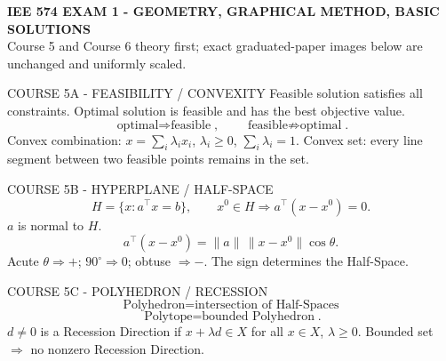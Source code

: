 \documentclass[10pt,landscape]{article}
\begin{document}
\fontsize{5.55}{5.85}\selectfont
\begin{center}
{\fontsize{10.2}{10.5}\selectfont\bfseries IEE 574 EXAM 1 - GEOMETRY, GRAPHICAL METHOD, BASIC SOLUTIONS}\\[-1pt]
{\fontsize{5.85}{6.05}\selectfont Course 5 and Course 6 theory first; exact graduated-paper images below are unchanged and uniformly scaled.}
\end{center}\vspace{-1.5pt}

{\fontsize{5.05}{5.28}\selectfont
\noindent
\begin{minipage}[t]{0.245\textwidth}\vspace{0pt}
\begin{theorybox}{COURSE 5A - FEASIBILITY / CONVEXITY}
Feasible solution satisfies all constraints. Optimal solution is feasible and has the best objective value.
\[
\boxed{\text{optimal}\Rightarrow\text{feasible}},\qquad\boxed{\text{feasible}\not\Rightarrow\text{optimal}}.
\]
Convex combination: $x=\sum_i\lambda_i x_i$, $\lambda_i\ge0$, $\sum_i\lambda_i=1$. Convex set: every line segment between two feasible points remains in the set.
\end{theorybox}
\end{minipage}\hfill
\begin{minipage}[t]{0.245\textwidth}\vspace{0pt}
\begin{theorybox}{COURSE 5B - HYPERPLANE / HALF-SPACE}
\[
\boxed{H=\{x:a^\top x=b\}},\qquad x^0\in H\Rightarrow\boxed{a^\top(x-x^0)=0}.
\]
$a$ is normal to $H$.
\[
\boxed{a^\top(x-x^0)=\|a\|\,\|x-x^0\|\cos\theta}.
\]
Acute $\theta\Rightarrow+$; $90^\circ\Rightarrow0$; obtuse $\Rightarrow-$. The sign determines the Half-Space.
\end{theorybox}
\end{minipage}\hfill
\begin{minipage}[t]{0.245\textwidth}\vspace{0pt}
\begin{theorybox}{COURSE 5C - POLYHEDRON / RECESSION}
\[
\boxed{\text{Polyhedron}=\text{intersection of Half-Spaces}}
\]
\[
\boxed{\text{Polytope}=\text{bounded Polyhedron}}.
\]
$d\ne0$ is a Recession Direction if $x+\lambda d\in X$ for all $x\in X$, $\lambda\ge0$. Bounded set $\Rightarrow$ no nonzero Recession Direction.

\end{theorybox}
\end{minipage}}
\end{document}
